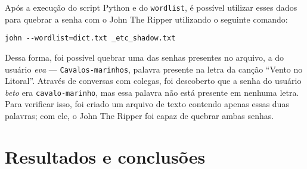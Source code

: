 \documentclass{sig-alternate-05-2015}
\begin{document}
Após a execução do script Python e do \texttt{wordlist}, é possível utilizar esses dados para quebrar a senha com o John The Ripper utilizando o seguinte comando:

\begin{verbatim}
john --wordlist=dict.txt _etc_shadow.txt
\end{verbatim}

Dessa forma, foi possível quebrar uma das senhas presentes no arquivo, a do usuário \textit{eva} — \texttt{Cavalos-marinhos}, palavra presente na letra da canção ``Vento no Litoral''.
Através de conversas com colegas, foi descoberto que a senha do usuário \textit{beto} era \texttt{cavalo-marinho}, mas essa palavra não está presente em nenhuma letra.
Para verificar isso, foi criado um arquivo de texto contendo apenas essas duas palavras; com ele, o John The Ripper foi capaz de quebrar ambas senhas.

\section{Resultados e conclusões}
%

%
%
\end{document}

